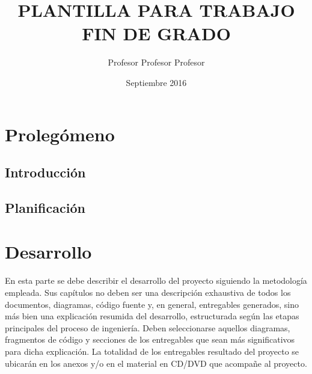 \documentclass[a4paper,11pt,twoside]{book}
\title{PLANTILLA PARA TRABAJO FIN DE GRADO}
\author{Profesor Profesor Profesor}
\date{Septiembre 2016}
\begin{document}
\pagestyle{empty}


\cleardoublepage


\cleardoublepage


\newpage


\newpage


\frontmatter

\pagestyle{plain}

\tableofcontents
\listoffigures
\listoftables

\mainmatter



\part{Prolegómeno}



\chapter{Introducción}
\label{chap:chap01}


\chapter{Planificación}
\label{chap:chap02}


\part{Desarrollo}
\null\vfill
\noindent En esta parte se debe describir el desarrollo del proyecto siguiendo la metodología empleada. Sus capítulos no deben ser una descripción exhaustiva de todos los documentos, diagramas, código fuente y, en general, entregables generados, sino más bien una explicación resumida del desarrollo, estructurada según las etapas principales del proceso de ingeniería. Deben seleccionarse aquellos diagramas, fragmentos de código y secciones de los entregables que sean más significativos para dicha explicación. La totalidad de los entregables resultado del proyecto se ubicarán en los anexos y/o en el material en CD/DVD que acompañe al proyecto.
\end{document}
